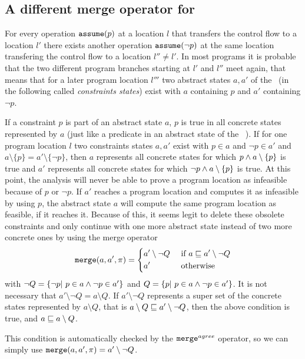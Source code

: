 \subsection{A different merge operator for \constraintsCPA}
For every operation $\texttt{assume}(p)$ at a location $l$ that transfers the control flow to a location $l'$ there exists another operation $\texttt{assume}(\neg p)$ at the same location transfering the control flow to a location $l'' \neq l'$.
In most programs it is probable that the two different program branches starting at $l'$ and $l''$ meet again, that means that for a later program location $l'''$ two abstract states $a, a'$ of the \constraintsCPA\ (in the following  called \emph{constraints states}) exist with $a$ containing $p$ and $a'$ containing $\neg p$.

If a constraint $p$ is part of an abstract state $a$, $p$ is true in all concrete states represented by $a$ (just like a predicate in an abstract state of the \predicateCPA\ \cite{Beyer2008}).
If for one program location $l$ two constraints states $a, a'$ exist with $p \in a$ and $\neg p \in a'$ and $a \setminus \{ p \} = a' \setminus \{ \neg p \}$,
then $a$ represents all concrete states for which $p \wedge a \setminus \{ p \}$ is true and $a'$ represents all concrete states for which $\neg p \wedge a \setminus \{ p \}$ is true.
At this point, the analysis will never be able to prove a program location as infeasible because of $p$ or $\neg p$.
If $a'$ reaches a program location and computes it as infeasible by using $p$, the abstract state $a$ will compute the same program location as feasible, if it reaches it.
Because of this, it seems legit to delete these obsolete constraints and only continue with one more abstract state instead of two more concrete ones by using the merge operator
\[ \texttt{merge} (a, a', \pi) = \begin{dcases}
a' \setminus \neg Q & \text{ if } a \sqsubseteq a' \setminus \neg Q \\
a' & \text{ otherwise}
\end{dcases} \]
with $\neg Q = \{\neg p |\ p \in a \wedge \neg p \in a' \}$ and $Q = \{ p |\ p \in a \wedge \neg p \in a' \}$.
It is not necessary that $a' \setminus \neg Q = a \setminus Q$.
If $a' \setminus \neg Q$ represents a super set of the concrete states represented by $a \setminus Q$, that is $a \setminus Q \sqsubseteq a' \setminus \neg Q$, then the above condition is true, and $a \sqsubseteq a \setminus Q$.

This condition is automatically checked by the ${\texttt{merge}^{agree}}$ operator, so we can simply use $\texttt{merge}(a, a', \pi) = a' \setminus \neg Q$.